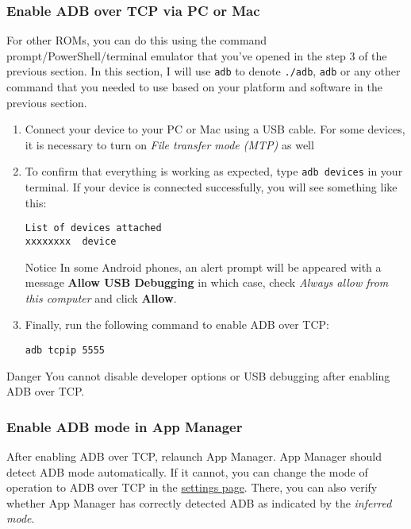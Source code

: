 \subsubsection{Enable ADB over TCP via PC or Mac}\label{subsubsec:enable-adb-over-tcp-via-pc-or-mac} %
For other ROMs, you can do this using the command prompt/PowerShell/terminal emulator that you've opened in the step 3
of the previous section. In this section, I will use \texttt{adb} to denote \texttt{./adb}, \texttt{adb} or any other
command that you needed to use based on your platform and software in the previous section.
\begin{enumerate}
    \item Connect your device to your PC or Mac using a USB cable. For some devices, it is necessary to turn on
    \textit{File transfer mode (MTP)} as well
    \item To confirm that everything is working as expected, type \texttt{adb devices} in your terminal. If your device
    is connected successfully, you will see something like this:
    \begin{Verbatim}
List of devices attached
xxxxxxxx  device
    \end{Verbatim}
    \begin{tip}{Notice}
        In some Android phones, an alert prompt will be appeared with a message \textbf{Allow USB Debugging}
        in which case, check \textit{Always allow from this computer} and click \textbf{Allow}.
    \end{tip}
    \item Finally, run the following command to enable ADB over TCP:
    \begin{verbatim}
adb tcpip 5555
    \end{verbatim}
\end{enumerate}

\begin{danger}{Danger}
    You cannot disable developer options or USB debugging after enabling ADB over TCP\@.
\end{danger}

\subsubsection{Enable ADB mode in App Manager}\label{subsubsec:adb-mode-in-app-manager} %
After enabling ADB over TCP, relaunch App Manager. App Manager should detect ADB mode automatically. If it cannot,
you can change the mode of operation to ADB over TCP in the \hyperref[subsec:mode-of-operation]{settings page}.
There, you can also verify whether App Manager has correctly detected ADB as indicated by the \textit{inferred mode}.

